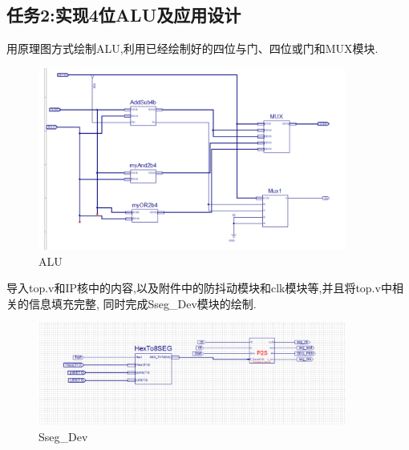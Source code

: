 \documentclass{article}
\begin{document}
\subsection*{任务2:实现4位ALU及应用设计}

用原理图方式绘制ALU,利用已经绘制好的四位与门、四位或门和MUX模块.
    \begin{figure}[H]
    \centering
    \includegraphics[width=0.9\textwidth]{lab8/5.png}
    \caption{\label{Lab8}ALU}
    \end{figure}

导入top.v和IP核中的内容,以及附件中的防抖动模块和clk模块等,并且将top.v中相关的信息填充完整,
同时完成Sseg\_Dev模块的绘制.
\begin{figure}[H]
    \centering
    \includegraphics[width=0.9\textwidth]{lab8/7.png}
    \caption{\label{Lab8}Sseg\_Dev}
    \end{figure}
    
\end{document}
